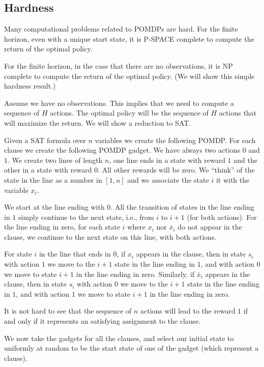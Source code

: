 \subsection{Hardness}

Many computational problems related to POMDPs are hard. For the
finite horizon, even with a unique start state, it is P-SPACE
complete to compute the return of the optimal policy.

For the finite horizon, in the case that there are no observations,
it is NP complete to compute the return of the optimal policy. (We
will show this simple hardness result.)

Assume we have no observations. This implies that we need to compute
a sequence of $H$ actions. The optimal policy will be the sequence
of $H$ actions that will maximize the return. We will show a
reduction to SAT.

Given a SAT formula over $n$ variables we create the following
POMDP. For each clause we create the following POMDP gadget. We have
always two actions $0$ and $1$. We create two lines of length $n$,
one line ends in a state with reward $1$ and the other in a state
with reward $0$. All other rewards will be zero. We ``think'' of the
state in the line as a number in $[1,n]$ and we associate the state
$i$ it with the variable $x_i$.

We start at the line ending with $0$. All the transition of states
in the line ending in $1$ simply continue to the next state, i.e.,
from $i$ to $i+1$ (for both actions). For the line ending in zero,
for each state $i$ where $x_i$ nor $\bar{x}_i$ do not appear in the
clause, we continue to the next state on this line, with both
actions.

For state $i$ in the line that ends in $0$, if $x_i$ appears
 in the clause, then in state $s_i$ with action $1$ we
move to the $i+1$ state in the line ending in $1$, and with action
$0$ we move to state $i+1$ in the line ending in zero.
%
Similarly, if $\bar{x}_i$ appears in the clause,  then in state
$s_i$ with action $0$ we move to the $i+1$ state in the line ending
in $1$, and with action $1$ we move to state $i+1$ in the line
ending in zero.

It is not hard to see that the sequence of $n$ actions will lead to
the reward $1$ if and only if it represents an satisfying assignment
to the clause.

We now take the gadgets for all the clauses, and select our initial
state to uniformly at random to be the start state of one of the
gadget (which represent a clause).

